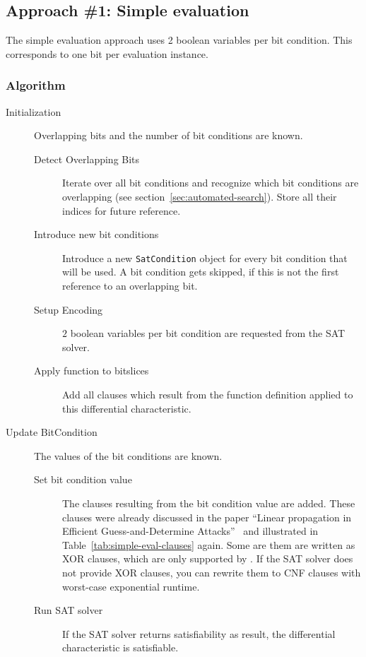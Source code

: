 \subsection{Approach \#1: Simple evaluation}
\label{sec:encoding:simple-evaluation}
%
The simple evaluation approach uses 2 boolean variables per bit condition. This corresponds to one bit per evaluation instance.

\subsubsection{Algorithm}
\label{sec:simple-evaluation-algorithm}
%
\begin{description}
  \item[Initialization] Overlapping bits and the number of bit conditions are known.
    \begin{description}
      \item[Detect Overlapping Bits] Iterate over all bit conditions and recognize which bit conditions are overlapping (see section~\ref{sec:automated-search}). Store all their indices for future reference.
      \item[Introduce new bit conditions] Introduce a new \texttt{SatCondition} object for every bit condition that will be used. A bit condition gets skipped, if this is not the first reference to an overlapping bit.
      \item[Setup Encoding] $2$ boolean variables per bit condition are requested from the SAT solver.
      \item[Apply function to bitslices] Add all clauses which result from the function definition applied to this differential characteristic.
    \end{description}
  \item[Update BitCondition] The values of the bit conditions are known.
    \begin{description}
      \item[Set bit condition value] The clauses resulting from the bit condition value are added. These clauses were already discussed in the paper ``Linear propagation in Efficient Guess-and-Determine Attacks''~\cite[6]{Cry16} and illustrated in Table~\ref{tab:simple-eval-clauses} again. Some are them are written as XOR clauses, which are only supported by \cmsat{}. If the SAT solver does not provide XOR clauses, you can rewrite them to CNF clauses with worst-case exponential runtime.
      \item[Run SAT solver] If the SAT solver returns satisfiability as result, the differential characteristic is satisfiable.
    \end{description}
\end{description}

